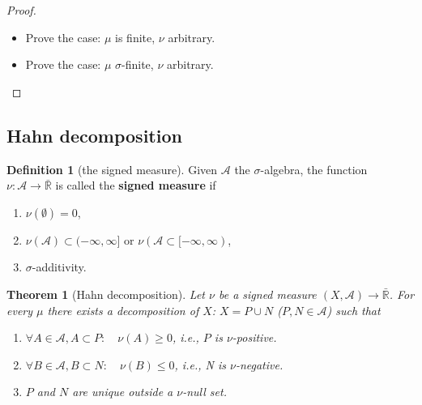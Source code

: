 \documentclass[a4paper,11pt,oneside,fleqn]{book}
\newtheorem{theorem}{Theorem}[section]
\theoremstyle{definition}
\newtheorem{definition}{Definition}[section]
\theoremstyle{remark}
\begin{document}
\begin{proof}
\begin{itemize}
		We define $\tau = \mu + \nu$, sine now $mu \leq \tau$ and $\nu \leq \tau$, we can apply the lemma above, and get $\tau = g \circ \mu$ and $\tau = h \circ \nu$. Now define $N:= \{M \subset X | \mu(M) = 0\}$ and $f$:
		\begin{equation*}
			f(x) = \left\{ \begin{aligned}
				\frac{h(x)}{g(x)} \quad & x \in N^c\\
				0 \quad & x \in N
			\end{aligned}\right.
		\end{equation*}
		then $\forall A \in \mathcal{A}$( $N$ excluded):
		\begin{equation*}
			\nu(A) = \int_A h d \tau = \int_A f \circ g d\tau = \int_A f d \mu
		\end{equation*}
		\item Prove the case: $\mu$ is finite, $\nu$ arbitrary. 
		\item Prove the case: $\mu$ $\sigma$-finite, $\nu$ arbitrary. 
	\end{itemize}
\end{proof}


\subsection{Hahn decomposition}
\begin{definition}[the signed measure]
	Given $\mathcal{A}$ the $\sigma$-algebra, the function $\nu: \mathcal{A} \rightarrow \bar{\mathbb{R}}$ is called the \textbf{signed measure} if 
	\begin{enumerate}
		\item $\nu(\emptyset) = 0$,
		\item $\nu(\mathcal{A}) \subset (-\infty, \infty]$ or $\nu(\mathcal{A} \subset [-\infty, \infty)$,
		\item $\sigma$-additivity. 
	\end{enumerate}
\end{definition}


\begin{theorem}[Hahn decomposition]
Let $\nu$ be a signed measure $(X, \mathcal{A}) \rightarrow \bar{\mathbb{R}}$. For every $\mu$ there exists a decomposition of $X$: $X = P \cup N$ ($P, N \in \mathcal{A}$) such that 
\begin{enumerate}
	\item $\forall A \in \mathcal{A}, A \subset P:\quad \nu(A) \ge 0$, i.e., $P$ is $\nu$-positive. 
	\item $\forall B \in \mathcal{A}, B \subset N: \quad \nu(B) \le 0$, i.e., N is $\nu$-negative. 
	\item $P$ and $N$ are unique outside a $\nu$-null set. 
\end{enumerate}
\end{theorem}
\end{document}
